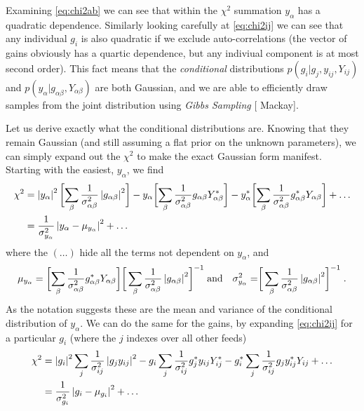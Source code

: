\documentclass{revtex4}
\renewcommand{\eqref}[1]{\cref{#1}}
\newcommand{\tcite}[1]{[{\color{red} #1}]}
\begin{document}
Examining \eqref{eq:chi2ab} we can see that within the $\chi^2$ summation
$y_\alpha$ has a quadratic dependence. Similarly looking carefully at
\eqref{eq:chi2ij} we can see that any individual $g_i$ is also quadratic if we
exclude auto-correlations (the vector of gains obviously has a quartic
dependence, but any indiviual component is at most second order). This fact
means that the \emph{conditional} distributions $p(g_i | g_j, y_{ij}, Y_{ij})$
and $p( y_\alpha | g_{\alpha\beta} , Y_{\alpha\beta})$ are both Gaussian, and
we are able to efficiently draw samples from the joint distribution using
\emph{Gibbs Sampling} \tcite{Mackay}.

Let us derive exactly what the conditional distributions are. Knowing that
they remain Gaussian (and still assuming a flat prior on the unknown
parameters), we can simply expand out the $\chi^2$ to make the exact Gaussian
form manifest. Starting with the easiest, $y_\alpha$, we find
\begin{align}
\label{eq:chi2ab}
\chi^2 & = \left\lvert y_\alpha \right\rvert^2 \biggl[ \sum_{\beta} \frac{1}{\sigma_{\alpha\beta}^2} \left\lvert g_{\alpha\beta} \right\rvert^2 \biggr] - 
    y_\alpha \biggl[ \sum_{\beta} \frac{1}{\sigma_{\alpha\beta}^2} g_{\alpha\beta} Y_{\alpha\beta}^* \biggr] - 
    y_\alpha^* \biggl[ \sum_{\beta} \frac{1}{\sigma_{\alpha\beta}^2} g_{\alpha\beta}^* Y_{\alpha\beta} \biggr] + \ldots \\
    & = \frac{1}{\sigma_{y_\alpha}^2} \left\lvert y_\alpha - \mu_{y_\alpha} \right\rvert^2 + \ldots
\end{align}
where the $(\ldots)$ hide all the terms not dependent on $y_\alpha$, and
\begin{equation}
\mu_{y_\alpha} = \biggl[ \sum_{\beta} \frac{1}{\sigma_{\alpha\beta}^2} g_{\alpha\beta}^* Y_{\alpha\beta} \biggr] \biggr[ \sum_{\beta} \frac{1}{\sigma_{\alpha\beta}^2} \left\lvert g_{\alpha\beta} \right\rvert^2 \biggr]^{-1}
\; \text{and} \quad
\sigma_{y_\alpha}^2 = \biggr[ \sum_{\beta} \frac{1}{\sigma_{\alpha\beta}^2} \left\lvert g_{\alpha\beta} \right\rvert^2 \biggr]^{-1} \; .
\end{equation}
As the notation suggests these are the mean and variance of the conditional
distribution of $y_\alpha$. We can do the same for the gains, by expanding
\eqref{eq:chi2ij} for a particular $g_i$ (where the $j$ indexes over all other
feeds)
\begin{align}
\chi^2 &= \left\lvert g_i \right\rvert^2 \sum_j \frac{1}{\sigma_{ij}^2} \left\lvert g_j y_{ij} \right\rvert^2 -
    g_i \sum_j \frac{1}{\sigma_{ij}^2} g_j^* y_{ij} Y_{ij}^*  -
    g_i^* \sum_j \frac{1}{\sigma_{ij}^2} g_j y_{ij}^* Y_{ij} + \ldots \\
    & = \frac{1}{\sigma_{g_i}^2} \left\lvert g_i - \mu_{g_i} \right\rvert^2 + \ldots
\end{align}
\end{document}
